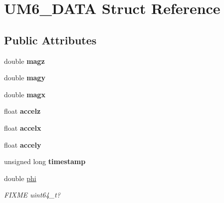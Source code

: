 \hypertarget{structUM6__DATA}{}\section{U\+M6\+\_\+\+D\+A\+TA Struct Reference}
\label{structUM6__DATA}
\subsection*{Public Attributes}
\begin{DoxyCompactItemize}
\item 
\mbox{\label{structUM6__DATA_ab432152c206ac734189c3376793e296f}} 
double {\bfseries magz}
\item 
\mbox{\label{structUM6__DATA_a3d3764f71a27a910cc2efedc1efefe9e}} 
double {\bfseries magy}
\item 
\mbox{\label{structUM6__DATA_a7c5fb0dae9e66418cac743cabdfeba8a}} 
double {\bfseries magx}
\item 
\mbox{\label{structUM6__DATA_a0a1efe884e8f84d5f17bf2f01f706e83}} 
float {\bfseries accelz}
\item 
\mbox{\label{structUM6__DATA_a1bb8ccce29ea98667dd067d5f1fb2d18}} 
float {\bfseries accelx}
\item 
\mbox{\label{structUM6__DATA_a10f5233fec4023a090abc979f1c45142}} 
float {\bfseries accely}
\item 
\mbox{\label{structUM6__DATA_aca698bcfa633ec72f856ec2be0529451}} 
unsigned long {\bfseries timestamp}
\item 
\mbox{\label{structUM6__DATA_a109dcf93fe90bb75f976a886fb1a804d}} 
double \hyperlink{structUM6__DATA_a109dcf93fe90bb75f976a886fb1a804d}{phi}
\begin{DoxyCompactList}\small\item\em F\+I\+X\+ME uint64\+\_\+t? \end{DoxyCompactList}\item 
\mbox{\label{structUM6__DATA_a4939eb18ae1915ccf6d3173342c5bdba}} 

\end{DoxyCompactItemize}
